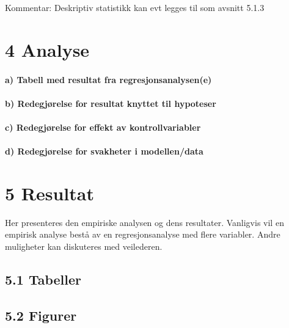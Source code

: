 \documentclass[
  12pt,
  a4paper,
  DIV=11,
  numbers=noendperiod]{scrartcl}
\let\oldparagraph\paragraph
\renewcommand{\paragraph}[1]{\oldparagraph{#1}\mbox{}}
\begin{document}
Kommentar: Deskriptiv statistikk kan evt legges til som avsnitt 5.1.3

\newpage

\section{4 Analyse}\label{analyse}

\paragraph{a) Tabell med resultat fra
regresjonsanalysen(e)}\label{a-tabell-med-resultat-fra-regresjonsanalysene}

\paragraph{b) Redegjørelse for resultat knyttet til
hypoteser}\label{b-redegjuxf8relse-for-resultat-knyttet-til-hypoteser}

\paragraph{c) Redegjørelse for effekt av
kontrollvariabler}\label{c-redegjuxf8relse-for-effekt-av-kontrollvariabler}

\paragraph{d) Redegjørelse for svakheter i
modellen/data}\label{d-redegjuxf8relse-for-svakheter-i-modellendata}

\newpage

\section{5 Resultat}\label{resultat}

Her presenteres den empiriske analysen og dens resultater. Vanligvis vil
en empirisk analyse bestå av en regresjonsanalyse med flere variabler.
Andre muligheter kan diskuteres med veilederen.

\subsection{5.1 Tabeller}\label{tabeller}

\subsection{5.2 Figurer}\label{figurer}
\end{document}
